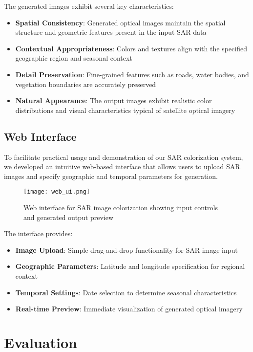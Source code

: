 The generated images exhibit several key characteristics:
\begin{itemize}
    \item \textbf{Spatial Consistency}: Generated optical images maintain the spatial structure and geometric features present in the input SAR data
    \item \textbf{Contextual Appropriateness}: Colors and textures align with the specified geographic region and seasonal context
    \item \textbf{Detail Preservation}: Fine-grained features such as roads, water bodies, and vegetation boundaries are accurately preserved
    \item \textbf{Natural Appearance}: The output images exhibit realistic color distributions and visual characteristics typical of satellite optical imagery
\end{itemize}

\subsection{Web Interface}

To facilitate practical usage and demonstration of our SAR colorization system, we developed an intuitive web-based interface that allows users to upload SAR images and specify geographic and temporal parameters for generation.

\begin{figure}[h!]
    \centering
    \texttt{[image: web\_ui.png]}
    \caption{Web interface for SAR image colorization showing input controls and generated output preview}
    \label{fig:web_ui}
\end{figure}

The interface provides:
\begin{itemize}
    \item \textbf{Image Upload}: Simple drag-and-drop functionality for SAR image input
    \item \textbf{Geographic Parameters}: Latitude and longitude specification for regional context
    \item \textbf{Temporal Settings}: Date selection to determine seasonal characteristics
    \item \textbf{Real-time Preview}: Immediate visualization of generated optical imagery
\end{itemize}

\section{Evaluation}

